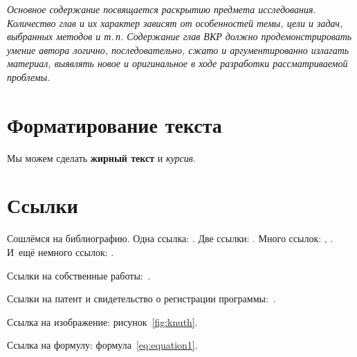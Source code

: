 {}\label{ch:ch1}


\textit{Основное содержание посвящается раскрытию предмета исследования.
Количество глав и их характер зависят от особенностей темы, цели и задач, выбранных методов и т.\,п.
Содержание глав ВКР должно продемонстрировать умение автора логично, последовательно, сжато и аргументированно излагать материал, выявлять новое и оригинальное в ходе разработки рассматриваемой проблемы.}

\vspace{2ex}

\section{Форматирование текста}\label{sec:ch1/sec1}

Мы можем сделать \textbf{жирный текст} и \textit{курсив}.

\section{Ссылки}\label{sec:ch1/sec2}

Сошлёмся на библиографию.
Одна ссылка: \cite[с.~54]{Sokolov}.
Две ссылки: \cite{Sokolov, Gaidaenko}.
Много ссылок:
\cite{Gost.7.0.53, Razumovski, Lagkueva, Pokrovski, Methodology, Berestova, Kriger}, \cite{Sirotko, Lukina, Encyclopedia, Nasirova}.
И~ещё немного ссылок:
\cite{Article,Book,Booklet,Conference,Inbook,Incollection,Manual,Mastersthesis,Misc,Phdthesis,Proceedings,Techreport,Unpublished}.


Ссылки на собственные работы:~\cite{bib2, bib3}.

Ссылки на патент и свидетельство о регистрации программы:~\cite{patbib1, progbib1}.

Ссылка на изображение: рисунок~\cref{fig:knuth}.

Ссылка на формулу: формула~\cref{eq:equation1}.

